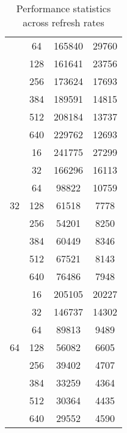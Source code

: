 \documentclass[letterpaper]{article}
\begin{document}
\begin{table}
\begin{multicols}{2}
\begin{tabular}{|c|c|c|c|}
                    & 64   & 165840      & 29760       \\ \cline{2-4} 
                    & 128  & 161641      & 23756       \\ \cline{2-4} 
                    & 256  & 173624      & 17693       \\ \cline{2-4} 
                    & 384  & 189591      & 14815       \\ \cline{2-4} 
                    & 512  & 208184      & 13737       \\ \cline{2-4} 
                    & 640  & 229762      & 12693       \\ \hline
\multirow{7}{*}{32} & 16   & 241775      & 27299       \\ \cline{2-4} 
                    & 32   & 166296      & 16113       \\ \cline{2-4} 
                    & 64   & 98822       & 10759       \\ \cline{2-4} 
                    & 128  & 61518       & 7778        \\ \cline{2-4} 
                    & 256  & 54201       & 8250        \\ \cline{2-4} 
                    & 384  & 60449       & 8346        \\ \cline{2-4} 
                    & 512  & 67521       & 8143        \\ \cline{2-4} 
                    & 640  & 76486       & 7948        \\ \hline
\multirow{7}{*}{64} & 16   & 205105      & 20227       \\ \cline{2-4} 
                    & 32   & 146737      & 14302       \\ \cline{2-4} 
                    & 64   & 89813       & 9489        \\ \cline{2-4} 
                    & 128  & 56082       & 6605        \\ \cline{2-4} 
                    & 256  & 39402       & 4707        \\ \cline{2-4} 
                    & 384  & 33259       & 4364        \\ \cline{2-4} 
                    & 512  & 30364       & 4435        \\ \cline{2-4} 
                    & 640  & 29552       & 4590        \\ \hline
\end{tabular}\smallbreak
{}
\end{multicols}
\caption{Performance statistics across refresh rates}\label{tbl:rate}
\end{table}\noindent
\end{document}
